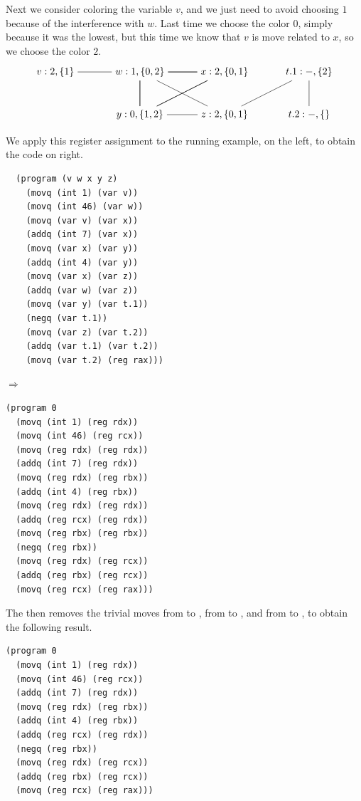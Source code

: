 \documentclass[11pt]{book}
\begin{document}
Next we consider coloring the variable $v$, and we just need to avoid
choosing $1$ because of the interference with $w$. Last time we choose
the color $0$, simply because it was the lowest, but this time we know
that $v$ is move related to $x$, so we choose the color $2$.
\[
\begin{tikzpicture}[baseline=(current  bounding  box.center)]
\node (v) at (0,0)    {$v:2,\{1\}$};
\node (w) at (3,0)    {$w:1,\{0,2\}$};
\node (x) at (6,0)    {$x:2,\{0,1\}$};
\node (y) at (3,-1.5) {$y:0,\{1,2\}$};
\node (z) at (6,-1.5) {$z:2,\{0,1\}$};
\node (t1) at (9,0)   {$t.1:-,\{2\}$};
\node (t2) at (9,-1.5) {$t.2:-,\{\}$};
\draw (t1) to (z);
\draw (t2) to (t1);
\draw (v) to (w);
\foreach \i in {w,x,y} 
{
  \foreach \j in {w,x,y}
  { 
    \draw (\i) to (\j);
  }
}
\draw (z) to (w);
\draw (z) to (y);
\end{tikzpicture}
\]

We apply this register assignment to the running example, on the left,
to obtain the code on right.

\begin{minipage}{0.45\textwidth}
\begin{lstlisting}
  (program (v w x y z)
    (movq (int 1) (var v))
    (movq (int 46) (var w))
    (movq (var v) (var x))
    (addq (int 7) (var x))
    (movq (var x) (var y))
    (addq (int 4) (var y))
    (movq (var x) (var z))
    (addq (var w) (var z))
    (movq (var y) (var t.1))
    (negq (var t.1))
    (movq (var z) (var t.2))
    (addq (var t.1) (var t.2))
    (movq (var t.2) (reg rax)))
\end{lstlisting}
\end{minipage}
$\Rightarrow$
\begin{minipage}{0.45\textwidth}
\begin{lstlisting}
(program 0
  (movq (int 1) (reg rdx))
  (movq (int 46) (reg rcx))
  (movq (reg rdx) (reg rdx))
  (addq (int 7) (reg rdx))
  (movq (reg rdx) (reg rbx))
  (addq (int 4) (reg rbx))
  (movq (reg rdx) (reg rdx))
  (addq (reg rcx) (reg rdx))
  (movq (reg rbx) (reg rbx))
  (negq (reg rbx))
  (movq (reg rdx) (reg rcx))
  (addq (reg rbx) (reg rcx))
  (movq (reg rcx) (reg rax)))
\end{lstlisting}
\end{minipage}

The  then removes the trivial moves from
 to , from  to , and from  to
, to obtain the following result.
\begin{lstlisting}
(program 0
  (movq (int 1) (reg rdx))
  (movq (int 46) (reg rcx))
  (addq (int 7) (reg rdx))
  (movq (reg rdx) (reg rbx))
  (addq (int 4) (reg rbx))
  (addq (reg rcx) (reg rdx))
  (negq (reg rbx))
  (movq (reg rdx) (reg rcx))
  (addq (reg rbx) (reg rcx))
  (movq (reg rcx) (reg rax)))
\end{lstlisting}
\end{document}
